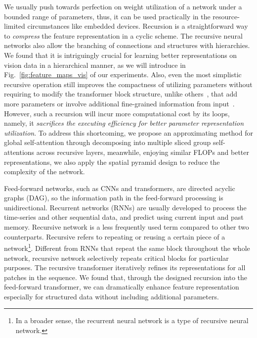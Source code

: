 \documentclass[runningheads]{llncs}
\begin{document}
	 We usually push towards perfection on weight utilization of a network under a bounded range of parameters, thus, it can be used practically in the resource-limited circumstances like embedded devices. Recursion is a straightforward way to {\em compress} the feature representation in a cyclic scheme. The recursive neural networks also allow the branching of connections and structures with hierarchies. We found that it is intriguingly crucial for learning better representations on vision data in a hierarchical manner, as we will introduce in Fig.~\ref{fig:feature_maps_vis} of our experiments. Also, even the most simplistic recursive operation still improves the compactness of utilizing parameters without requiring to modify the transformer block structure, unlike others~\cite{srinivas2021bottleneck,yuan2021tokens,heo2021rethinking,wang2021pyramid,wu2021cvt,liu2021swin,li2021localvit,xu2021co}, that add more parameters or involve additional fine-grained information from input~\cite{han2021transformer}. However, such a recursion will incur more computational cost by its loops, namely, it {\em sacrifices the executing efficiency for better parameter representation utilization}. To address this shortcoming, we propose an approximating method for global self-attention through decomposing into multiple sliced group self-attentions across recursive layers, meanwhile, enjoying similar FLOPs and better representations, we also apply the spatial pyramid design to reduce the complexity of the network.
	
Feed-forward networks, such as CNNs and transformers, are directed acyclic graphs (DAG), so the information path in the feed-forward processing is unidirectional. Recurrent networks (RNNs) are usually developed to process the time-series and other sequential data, and predict using current input and past memory. Recursive network is a less frequently used term compared to other two counterparts. Recursive refers to repeating or reusing a certain piece of a network\footnote{In a broader sense, the recurrent neural network is a type of recursive neural network.}. Different from RNNs that repeat the same block throughout the whole network, recursive network selectively repeats critical blocks for particular purposes. The recursive transformer iteratively refines its representations for all patches in the sequence. We found that, through the designed recursion into the feed-forward transformer, we can dramatically enhance feature representation especially for structured data without including additional parameters.
\end{document}
